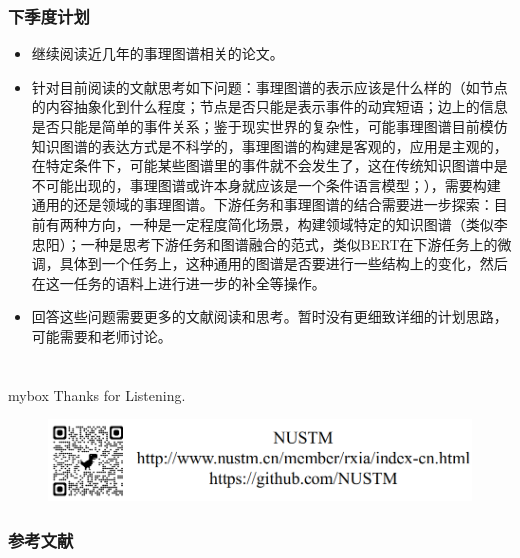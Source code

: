 \documentclass[10pt,aspectratio=43,mathserif]{beamer}
\begin{document}
        \begin{frame}
            \frametitle{\textbf{下季度计划}}
            \begin{itemize}
                \item 继续阅读近几年的事理图谱相关的论文。
                \item 针对目前阅读的文献思考如下问题：事理图谱的表示应该是什么样的（如节点的内容抽象化到什么程度；节点是否只能是表示事件的动宾短语；边上的信息是否只能是简单的事件关系；鉴于现实世界的复杂性，可能事理图谱目前模仿知识图谱的表达方式是不科学的，事理图谱的构建是客观的，应用是主观的，在特定条件下，可能某些图谱里的事件就不会发生了，这在传统知识图谱中是不可能出现的，事理图谱或许本身就应该是一个条件语言模型；），需要构建通用的还是领域的事理图谱。下游任务和事理图谱的结合需要进一步探索：目前有两种方向，一种是一定程度简化场景，构建领域特定的知识图谱（类似李忠阳）；一种是思考下游任务和图谱融合的范式，类似BERT在下游任务上的微调，具体到一个任务上，这种通用的图谱是否要进行一些结构上的变化，然后在这一任务的语料上进行进一步的补全等操作。
                \item 回答这些问题需要更多的文献阅读和思考。暂时没有更细致详细的计划思路，可能需要和老师讨论。
            \end{itemize}
        \end{frame}
            
\section*{}
            \begin{frame}

                \begin{center}
                    \begin{minipage}{1\textwidth}
                        \begin{beamercolorbox}[wd=0.70\textwidth, rounded=true, shadow=true]{mybox}
                        \LARGE \centering Thanks for Listening.
                        \end{beamercolorbox}
                    \end{minipage}
                \end{center}

                \begin{figure}[!t]
                    \centering
                    \includegraphics[width=.8\textwidth]{source/nustm_contact.png}
                    \label{figure4_ad}
                \end{figure}
            \end{frame}
            
\begin{frame}[allowframebreaks]
    \frametitle{参考文献}

        
   
\end{frame}
\end{document}
